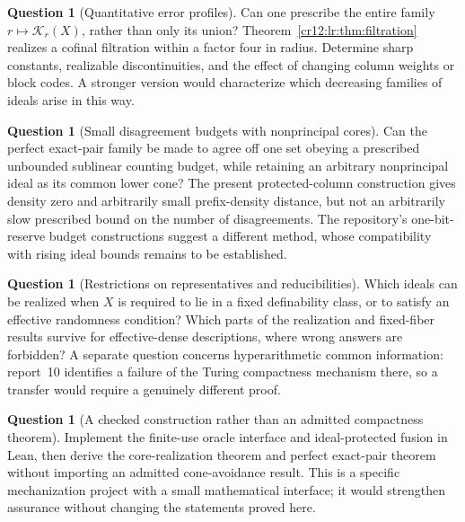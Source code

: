 \documentclass[11pt,letterpaper]{article}
\theoremstyle{plain}
\theoremstyle{definition}
\newtheorem{question}[theorem]{Question}
\theoremstyle{remark}
\numberwithin{equation}{section}
\begin{document}
\begin{question}[Quantitative error profiles]\label{cr12:lr:q:profiles}
Can one prescribe the entire family $r\mapsto\mathcal K_r(X)$, rather than only its
union? Theorem~\ref{cr12:lr:thm:filtration} realizes a cofinal filtration within a
factor four in radius. Determine sharp constants, realizable discontinuities, and the
effect of changing column weights or block codes. A stronger version would
characterize which decreasing families of ideals arise in this way.
\end{question}

\begin{question}[Small disagreement budgets with nonprincipal cores]\label{cr12:lr:q:budget}
Can the perfect exact-pair family be made to agree off one set obeying a prescribed
unbounded sublinear counting budget, while retaining an arbitrary nonprincipal ideal as
its common lower cone? The present protected-column construction gives density zero
and arbitrarily small prefix-density distance, but not an arbitrarily slow prescribed
bound on the number of disagreements. The repository's one-bit-reserve budget
constructions suggest a different method, whose compatibility with rising ideal bounds
remains to be established.
\end{question}

\begin{question}[Restrictions on representatives and reducibilities]\label{cr12:lr:q:restrictions}
Which ideals can be realized when $X$ is required to lie in a fixed definability class,
or to satisfy an effective randomness condition? Which parts of the realization and
fixed-fiber results survive for effective-dense descriptions, where wrong answers are
forbidden? A separate question concerns hyperarithmetic common information: report~10
identifies a failure of the Turing compactness mechanism there, so a transfer would
require a genuinely different proof.
\end{question}

\begin{question}[A checked construction rather than an admitted compactness theorem]\label{cr12:lr:q:lean}
Implement the finite-use oracle interface and ideal-protected fusion in Lean, then
derive the core-realization theorem and perfect exact-pair theorem without importing
an admitted cone-avoidance result. This is a specific mechanization project with a
small mathematical interface; it would strengthen assurance without changing the
statements proved here.
\end{question}
\end{document}
